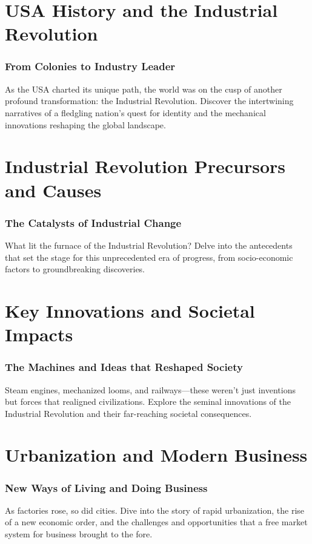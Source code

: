 \documentclass[a4paper,12pt]{book}
\begin{document}
\chapter{USA History and the Industrial Revolution}
\subsection*{From Colonies to Industry Leader}
As the USA charted its unique path, the world was on the cusp of another profound transformation: the Industrial Revolution. Discover the intertwining narratives of a fledgling nation's quest for identity and the mechanical innovations reshaping the global landscape.

\chapter{Industrial Revolution Precursors and Causes}
\subsection*{The Catalysts of Industrial Change}
What lit the furnace of the Industrial Revolution? Delve into the antecedents that set the stage for this unprecedented era of progress, from socio-economic factors to groundbreaking discoveries.

\chapter{Key Innovations and Societal Impacts}
\subsection*{The Machines and Ideas that Reshaped Society}
Steam engines, mechanized looms, and railways—these weren't just inventions but forces that realigned civilizations. Explore the seminal innovations of the Industrial Revolution and their far-reaching societal consequences.

\chapter{Urbanization and Modern Business}
\subsection*{New Ways of Living and Doing Business}
As factories rose, so did cities. Dive into the story of rapid urbanization, the rise of a new economic order, and the challenges and opportunities that a free market system for business brought to the fore.
\end{document}
